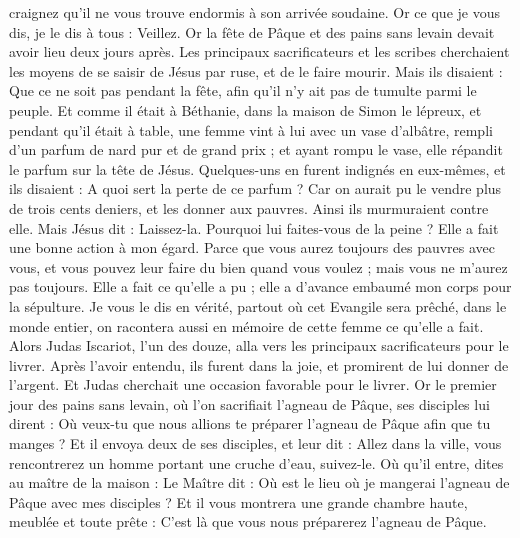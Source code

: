 \begin{multicols}{2}
craignez qu’il ne vous trouve endormis à son arrivée soudaine.
Or ce que je vous dis, je le dis à tous : Veillez.
\VerseOne{}Or la fête de Pâque et des pains sans levain devait avoir lieu deux jours après. Les principaux sacrificateurs et les scribes cherchaient les moyens de se saisir de Jésus par ruse, et de le faire mourir.
Mais ils disaient : Que ce ne soit pas pendant la fête, afin qu'il n’y ait pas de tumulte parmi le peuple.
Et comme il était à Béthanie, dans la maison de Simon le lépreux, et pendant qu’il était à table, une femme vint à lui avec un vase d'albâtre, rempli d'un parfum de nard pur et de grand prix ; et ayant rompu le vase, elle répandit le parfum sur la tête de Jésus.
Quelques-uns en furent indignés en eux-mêmes, et ils disaient : A quoi sert la perte de ce parfum ?
Car on aurait pu le vendre plus de trois cents deniers, et les donner aux pauvres. Ainsi ils murmuraient contre elle.
Mais Jésus dit : Laissez-la. Pourquoi lui faites-vous de la peine ? Elle a fait une bonne action à mon égard.
Parce que vous aurez toujours des pauvres avec vous, et vous pouvez leur faire du bien quand vous voulez ; mais vous ne m'aurez pas toujours.
Elle a fait ce qu’elle a pu ; elle a d’avance embaumé mon corps pour la sépulture.
Je vous le dis en vérité, partout où cet Evangile sera prêché, dans le monde entier, on racontera aussi en mémoire de cette femme ce qu’elle a fait.
Alors Judas Iscariot, l'un des douze, alla vers les principaux sacrificateurs pour le livrer.
Après l’avoir entendu, ils furent dans la joie, et promirent de lui donner de l'argent. Et Judas cherchait une occasion favorable pour le livrer.
Or le premier jour des pains sans levain, où l’on sacrifiait l'agneau de Pâque, ses disciples lui dirent : Où veux-tu que nous allions te préparer l'agneau de Pâque afin que tu manges ?
Et il envoya deux de ses disciples, et leur dit : Allez dans la ville, vous rencontrerez un homme portant une cruche d'eau, suivez-le.
Où qu’il entre, dites au maître de la maison : Le Maître dit : Où est le lieu où je mangerai l'agneau de Pâque avec mes disciples ?
Et il vous montrera une grande chambre haute, meublée et toute prête : C’est là que vous nous préparerez l'agneau de Pâque.

\end{multicols}
